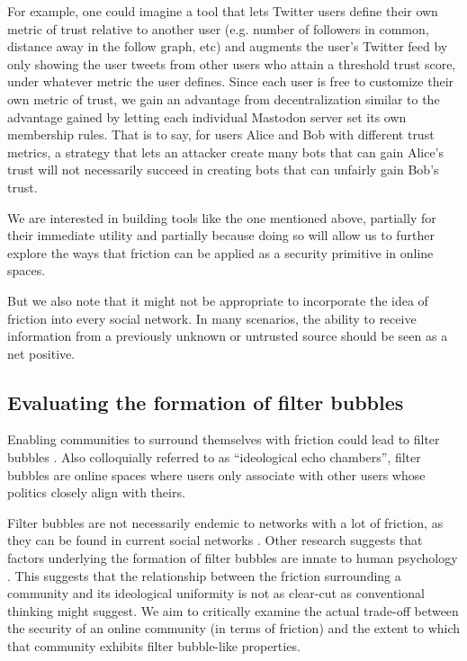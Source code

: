 \documentclass[sigconf,authordraft]{acmart}
\begin{document}
For example, one could imagine a tool that lets Twitter users define their own metric of trust relative to another user (e.g. number of followers in common, distance away in the follow graph, etc) and augments the user's Twitter feed by only showing the user tweets from other users who attain a threshold trust score, under whatever metric the user defines. Since each user is free to customize their own metric of trust, we gain an advantage from decentralization similar to the advantage gained by letting each individual Mastodon server set its own membership rules. That is to say, for users Alice and Bob with different trust metrics, a strategy that lets an attacker create many bots that can gain Alice's trust will not necessarily succeed in creating bots that can unfairly gain Bob's trust. 

We are interested in building tools like the one mentioned above, partially for their immediate utility and partially because doing so will allow us to further explore the ways that friction can be applied as a security primitive in online spaces.

But we also note that it might not be appropriate to incorporate the idea of friction into every social network. In many scenarios, the ability to receive information from a previously unknown or untrusted source should be seen as a net positive. 

\subsection{Evaluating the formation of filter bubbles}

Enabling communities to surround themselves with friction could lead to filter bubbles \cite{pariser2011filter}. Also colloquially referred to as ``ideological echo chambers'', filter bubbles are online spaces where users only associate with other users whose politics closely align with theirs.  

Filter bubbles are not necessarily endemic to networks with a lot of friction, as they can be found in current social networks \cite{garimella2018political}. Other research suggests that factors underlying the formation of filter bubbles are innate to human psychology \cite{knobloch2011reinforcement}. This suggests that the relationship between the friction surrounding a community and its ideological uniformity is not as clear-cut as conventional thinking might suggest. We aim to critically examine the actual trade-off between the security of an online community (in terms of friction) and the extent to which that community exhibits filter bubble-like properties.
\end{document}
